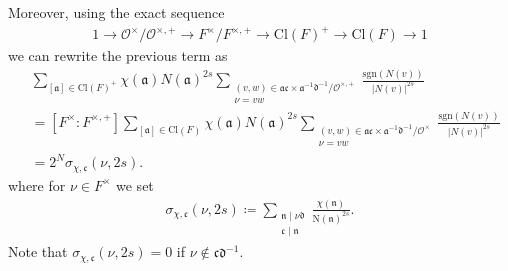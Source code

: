 \documentclass[twoside,a4paper,10pt]{article} %
\newcommand{\8}{\infty}
\newcommand{\R}{\mathbb{R}}
\newcommand{\nfrak}{\mathfrak{n}}
\newcommand{\afrak}{\mathfrak{a}}
\newcommand{\dfrak}{\mathfrak{d}}
\newcommand{\cfrak}{\mathfrak{c}}
\newcommand{\N}{\mathrm{N}}
\newcommand{\sgn}{\mathrm{sgn}}
\newcommand{\Ocal}{\mathcal{O}}
\newcommand{\Cl}{\textrm{Cl}}
\theoremstyle{mytheoremstyle}
\theoremstyle{remark}
\numberwithin{equation}{section}
\begin{document}
 Moreover, using the exact sequence
\begin{align}
1 \longrightarrow \Ocal^{\times}/\Ocal^{\times,+} \longrightarrow F^\times/F^{\times,+} \longrightarrow \Cl(F)^+\longrightarrow \Cl(F)\longrightarrow 1
\end{align}
we can rewrite the previous term as 
\begin{align}
& \sum_{[\afrak] \in \Cl(F)^+} \chi(\afrak) N(\afrak)^{2s}  \sum_{\substack{(v,w) \in \afrak\cfrak \times \afrak^{-1} \dfrak^{-1}/\Ocal^{\times,+} \\ \nu=vw }}  \frac{\sgn(N(v))}{\vert N(v)\vert^{2s}} \\
& = [F^\times: F^{\times,+}] \sum_{[\afrak] \in \Cl(F)} \chi(\afrak) N(\afrak)^{2s}  \sum_{\substack{(v,w) \in \afrak\cfrak \times \afrak^{-1} \dfrak^{-1}/\Ocal^{\times} \\ \nu=vw }}  \frac{\sgn(N(v))}{\vert N(v)\vert^{2s}}  \\
& = 2^N \sigma_{\chi,\cfrak}(\nu,2s).
\end{align}
where for $\nu \in F^\times$ we set
\begin{align}
 \sigma_{\chi,\cfrak}(\nu,2s) \coloneqq \sum_{\substack{ \nfrak \mid \nu \dfrak \\ \cfrak \mid \nfrak}} \frac{\chi(\nfrak)}{\N(\nfrak)^{2s}}.
\end{align}
Note that $\sigma_{\chi,\cfrak}(\nu,2s)=0$ if $\nu \not \in \cfrak\dfrak^{-1}$. 
\end{document}
